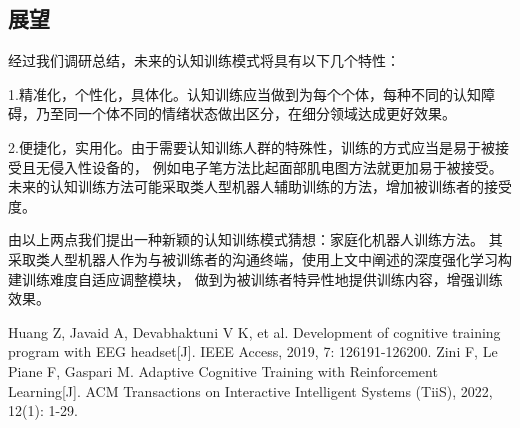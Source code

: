 \documentclass{article}
\begin{document}
    \subsection{展望}
    经过我们调研总结，未来的认知训练模式将具有以下几个特性：

    1.精准化，个性化，具体化。认知训练应当做到为每个个体，每种不同的认知障碍，乃至同一个体不同的情绪状态做出区分，在细分领域达成更好效果。

    2.便捷化，实用化。由于需要认知训练人群的特殊性，训练的方式应当是易于被接受且无侵入性设备的，
    例如电子笔方法比起面部肌电图方法就更加易于被接受。未来的认知训练方法可能采取类人型机器人辅助训练的方法，增加被训练者的接受度。

    由以上两点我们提出一种新颖的认知训练模式猜想：家庭化机器人训练方法。
    其采取类人型机器人作为与被训练者的沟通终端，使用上文中阐述的深度强化学习构建训练难度自适应调整模块，
    做到为被训练者特异性地提供训练内容，增强训练效果。

    
    \begin{thebibliography}{99}  

        Huang Z, Javaid A, Devabhaktuni V K, et al. Development of cognitive training program with EEG headset[J]. IEEE Access, 2019, 7: 126191-126200.
        Zini F, Le Piane F, Gaspari M. Adaptive Cognitive Training with Reinforcement Learning[J]. ACM Transactions on Interactive Intelligent Systems (TiiS), 2022, 12(1): 1-29.
        \end{thebibliography}
\end{document}
